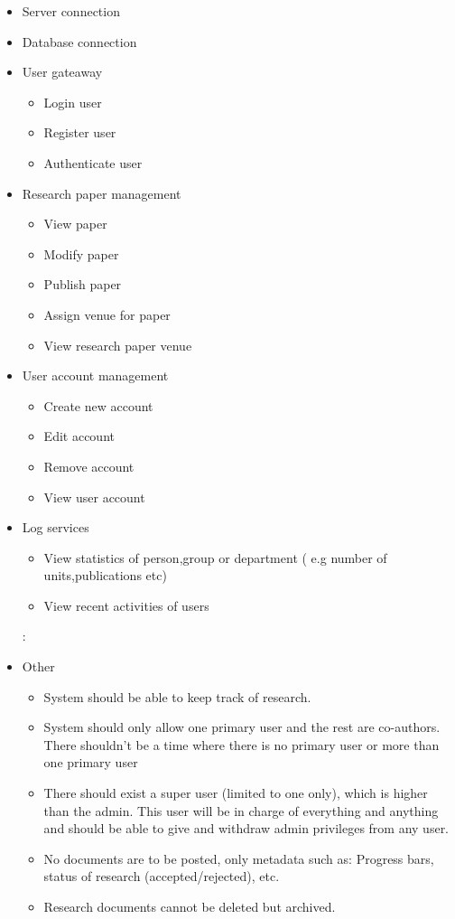 \documentclass[11pt]{article}
\begin{document}
	\begin{itemize}
		\item Server connection
		\item Database connection
		\item User gateaway
		\begin{itemize}
			\item Login user
			\item Register user
			\item Authenticate user
		\end{itemize}
		\item Research paper management
		\begin{itemize}
			\item View paper
			\item Modify paper
			\item Publish paper
			\item Assign venue for paper
			\item View research paper venue
		\end{itemize}
		\item User account management
		\begin{itemize}
			\item Create new account
			\item Edit account
			\item Remove account
			\item View user account
		\end{itemize}
		\item Log services
		\begin{itemize}
			\item View statistics of person,group or department ( e.g number of units,publications etc)
			\item View recent activities of users
		\end{itemize}:
			\item Other
		\begin{itemize}
			\item System should be able to keep track of research.
		\end{itemize}
		\begin{itemize}
			\item System should only allow one primary user and the rest are co-authors. There shouldn’t be a time where there is no primary user or more than one primary user
		\end{itemize}
		\begin{itemize}
			\item There should exist a super user (limited to one only), which is higher than the admin. This user will be in charge of everything and anything and should be able to give and withdraw admin privileges from any user.
		\end{itemize}
		\begin{itemize}
			\item No documents are to be posted, only metadata such as: Progress bars, status of research (accepted/rejected), etc.
		\end{itemize}
		\begin{itemize}
			\item Research documents cannot be deleted but archived.
			

\end{itemize}
\end{itemize}
\end{document}
